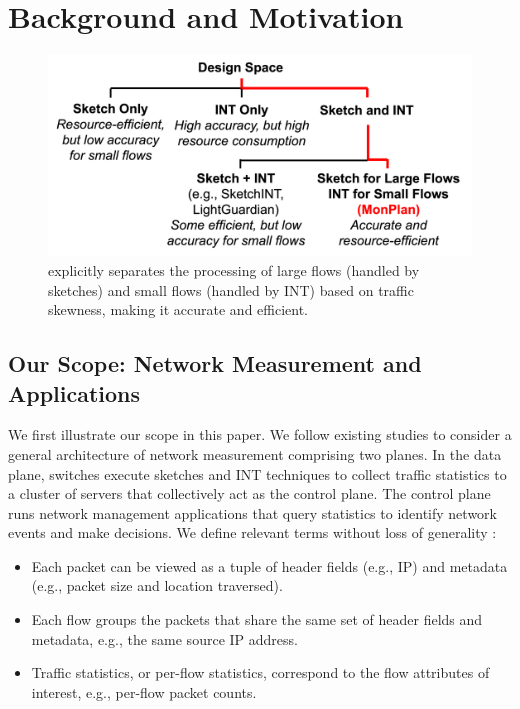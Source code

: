 \section{Background and Motivation}\label{background}

\begin{figure}
    \centering
    \includegraphics[width=\linewidth]{pics/DesignSpace.png}
    \caption{\sysname explicitly separates the processing of large flows (handled by sketches) and small flows (handled by INT) based on traffic skewness, making it accurate and efficient.}
    \label{DesignSpace}
\end{figure}

\subsection{Our Scope: Network Measurement and Applications}

We first illustrate our scope in this paper. We follow existing studies \cite{namkung2022sketchlib,anup2022hetero,liu2016one} to consider a general architecture of network measurement comprising two planes. In the data plane, switches execute sketches and INT techniques to collect traffic statistics to a cluster of servers that collectively act as the control plane. The control plane runs network management applications that query statistics to identify network events and make decisions. We define relevant terms without loss of generality \cite{liu2024disco,wu2025lemon}:

\begin{itemize}[leftmargin=*]
%
    \item Each packet can be viewed as a tuple of header fields (e.g., IP) and metadata (e.g., packet size and location traversed).
%
    \item Each flow groups the packets that share the same set of header fields and metadata, e.g., the same source IP address. 
%
    \item Traffic statistics, or per-flow statistics, correspond to the flow attributes of interest, e.g., per-flow packet counts. 
%
\end{itemize}

